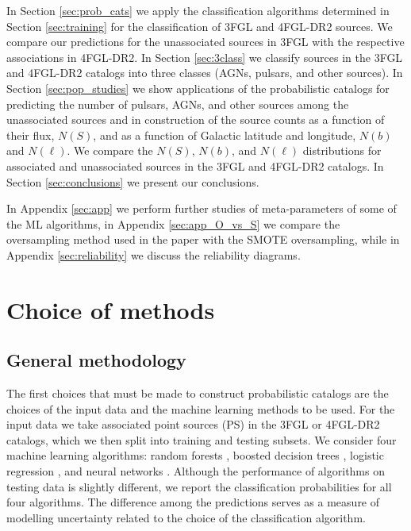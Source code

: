 \documentclass{aa}
\newcommand{\lb}{\label}
\begin{document}
In Section \ref{sec:prob_cats} we apply the classification algorithms determined in Section \ref{sec:training} for the classification of 3FGL and 4FGL-DR2 sources.
We compare our predictions for the unassociated sources in 3FGL with the respective associations in 4FGL-DR2.
In Section \ref{sec:3class} we classify sources in the 3FGL and 4FGL-DR2 catalogs into three classes (AGNs, pulsars, and other sources).
In Section \ref{sec:pop_studies} we show applications of the probabilistic catalogs for predicting the number of pulsars, AGNs, and other sources among the unassociated sources and in construction of the source counts as a function of their flux, $N(S)$, and as a function of 
Galactic latitude and longitude, $N(b)$ and $N(\ell)$.
We compare the $N(S)$, $N(b)$, and $N(\ell)$ distributions for associated and unassociated sources in the 3FGL and 4FGL-DR2 catalogs.
In Section \ref{sec:conclusions} we present our conclusions.

In Appendix \ref{sec:app} we perform further studies of meta-parameters of some of the ML algorithms, 
in Appendix \ref{sec:app_O_vs_S} we compare the oversampling method used in the paper with the SMOTE oversampling,
while in Appendix \ref{sec:reliability} we discuss the reliability diagrams.


\section{Choice of methods}
\lb{sec:methods}


\subsection{General methodology}
\lb{sec:general_method}

The first choices that must be made to construct probabilistic catalogs are the choices of the input data and the machine learning methods to be used.
For the input data we take associated point sources (PS) in the 3FGL or 4FGL-DR2 catalogs, which we then split into training and testing subsets.
We consider four machine learning algorithms: random forests \citep[RF,][]{709601, Breiman:2001hzm}, 
boosted decision trees \citep[BDT,][]{friedman2001},  
logistic regression \citep[LR,][]{cox1958}, 
and neural networks \citep[NN,][]{Hopfield:1982pe}.
Although the performance of algorithms on testing data is slightly different, 
we report the classification probabilities for all four algorithms.
The difference among the predictions serves as a measure of modelling uncertainty related 
to the choice of the classification algorithm.
\end{document}
